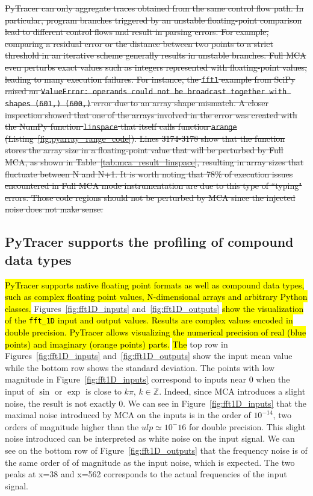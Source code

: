 \documentclass[10pt,journal,compsoc]{IEEEtran}
\newcommand{\pytracer}[0]{PyTracer\xspace}
\DeclareRobustCommand{\add}[1]{\sethlcolor{lightgreen}\hl{#1}}
\DeclareRobustCommand{\remove}[1]{\textcolor{lightred}{\sout{#1}}}
\DeclareRobustCommand{\add}[1]{#1}
\DeclareRobustCommand{\remove}[1]{}
\begin{document}
\remove{\pytracer can only aggregate traces obtained from the same control flow path. In
    particular, program branches triggered by an unstable floating-point comparison
    lead to different control flows and result in parsing errors. For example,
    comparing a residual error or the distance between two points to a strict
    threshold in an iterative scheme generally results in unstable branches. Full
    MCA even perturbs exact values such as integers represented with floating-point
    values, leading to many execution failures. For instance, the \texttt{fft1}
    example from SciPy raised an \texttt{ValueError: operands could not be broadcast
        together with shapes (601,) (600,)} error due to an array shape mismatch. A
    closer inspection showed that one of the arrays involved in the error was
    created with the NumPy function \texttt{linspace} that itself calls function
    \texttt{arange} (Listing~\ref{fig:pyarray_range_code}). Lines 3174-3178 show
    that the function stores the array size in a floating-point value that will be
    perturbed by Full MCA, as shown in Table~\ref{tab:mca_result_linspace},
    resulting in array sizes that fluctuate between N and N+1. It is worth noting
    that 78\% of execution issues encountered in Full MCA mode instrumentation are
    due to this type of ``typing" errors.  
    Those code regions should not be perturbed by MCA since the injected noise does
    not make sense.}

\subsection{\pytracer supports the profiling of compound data types}

\add{PyTracer supports native floating point formats as well as compound data types,
    such as complex floating point values, N-dimensional arrays and arbitrary Python
    classes.}
Figures~\ref{fig:fft1D_inputs} and~\ref{fig:fft1D_outputs} \add{show the
    visualization of the \texttt{fft\_1D} input and output values. Results are
    complex values encoded in double precision. PyTracer allows visualizing the
    numerical precision of real (blue points) and imaginary (orange points) parts.}
\add{The} top row in Figures~\ref{fig:fft1D_inputs} and~\ref{fig:fft1D_outputs}
show the input mean value while the bottom row shows the standard deviation. The
points with low magnitude in Figure~\ref{fig:fft1D_inputs} correspond to inputs
near 0 when the input of $\sin$ or $\exp$ is close to $k\pi$, $k \in
    \mathbb{Z}$. Indeed, since MCA introduces a slight noise, the result is not
exactly 0. We can see in Figure~\ref{fig:fft1D_inputs} that the maximal noise
introduced by MCA on the inputs is in the order of $10^{-14}$, two orders of
magnitude higher than the $ulp \simeq 10^-16$ for double precision. This slight
noise introduced can be interpreted as white noise on the input signal. We can
see on the bottom row of Figure~\ref{fig:fft1D_outputs} that the frequency noise
is of the same order of of magnitude as the input noise, which is expected. The
two peaks at x=38 and x=562 corresponds to the actual frequencies of the input
signal.
\end{document}
